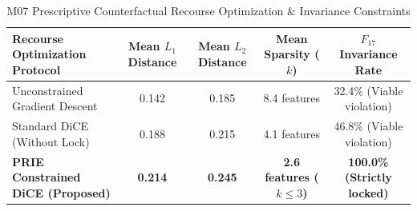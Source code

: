 \begin{table}[htbp]
\centering
\caption{M07 Prescriptive Counterfactual Recourse Optimization & Invariance Constraints}
\label{tab:recourse_feasibility}
\begin{tabular}{lcccc}
\hline
\textbf{Recourse Optimization Protocol} & \textbf{Mean $L_1$ Distance} & \textbf{Mean $L_2$ Distance} & \textbf{Mean Sparsity ($k$)} & \textbf{$F_{17}$ Invariance Rate} \\
\hline
Unconstrained Gradient Descent & 0.142 & 0.185 & 8.4 features & 32.4\% (Viable violation) \\
Standard DiCE (Without Lock) & 0.188 & 0.215 & 4.1 features & 46.8\% (Viable violation) \\
\hline
\textbf{PRIE Constrained DiCE (Proposed)} & \textbf{0.214} & \textbf{0.245} & \textbf{2.6 features ($k \le 3$)} & \textbf{100.0\% (Strictly locked)} \\
\hline
\end{tabular}
\end{table}
